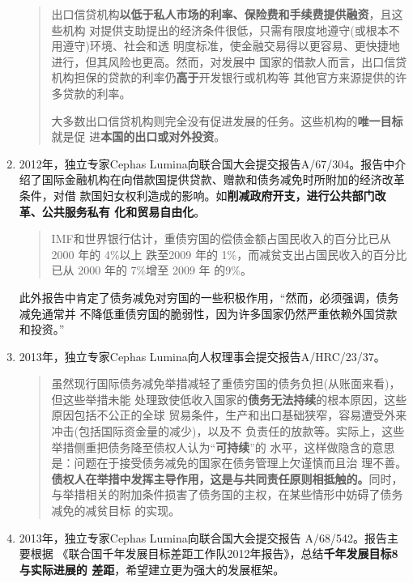 \begin{enumerate}
\begin{quotation}
    出口信贷机构\textbf{以低于私人市场的利率、保险费和手续费提供融资}，且这些机构
    对提供支助提出的经济条件很低，只需有限度地遵守(或根本不用遵守)环境、社会和透
    明度标准，使金融交易得以更容易、更快捷地进行，但其风险也更高。然而，对发展中
    国家的借款人而言，出口信贷机构担保的贷款的利率仍\textbf{高于}开发银行或机构等
    其他官方来源提供的许多贷款的利率。

    大多数出口信贷机构则完全没有促进发展的任务。这些机构的\textbf{唯一目标}就是促
    进\textbf{本国的出口或对外投资}。
  \end{quotation}

\item 2012年，独立专家Cephas Lumina向联合国大会提交报告A/67/304。报告中介
  绍了国际金融机构在向借款国提供贷款、赠款和债务减免时所附加的经济改革条件，对借
  款国妇女权利造成的影响。如\textbf{削减政府开支，进行公共部门改革、公共服务私有
    化和贸易自由化}。
  \begin{quotation}
    IMF和世界银行估计，重债穷国的偿债金额占国民收入的百分比已从 2000 年的 4\%以上
    跌至2009 年的 1\%，而减贫支出占国民收入的百分比已从 2000 年的 7\%增至 2009 年
    的9\%。
  \end{quotation}

  此外报告中肯定了债务减免对穷国的一些积极作用，“然而，必须强调，债务减免通常并
  不降低重债穷国的脆弱性，因为许多国家仍然严重依赖外国贷款和投资。”

\item 2013年，独立专家Cephas Lumina向人权理事会提交报告A/HRC/23/37。

  \begin{quotation}
    虽然现行国际债务减免举措减轻了重债穷国的债务负担(从账面来看)，但这些举措未能
    处理致使低收入国家的\textbf{债务无法持续}的根本原因，这些原因包括不公正的全球
    贸易条件，生产和出口基础狭窄，容易遭受外来冲击(包括国际资金量的减少)，以及不
    负责任的放款等。实际上，这些举措侧重把债务降至债权人认为“\textbf{可持续}”的
    水平，这样做隐含的意思是：问题在于接受债务减免的国家在债务管理上欠谨慎而且治
    理不善。\textbf{债权人在举措中发挥主导作用，这是与共同责任原则相抵触的。}同时，
    与举措相关的附加条件损害了债务国的主权，在某些情形中妨碍了债务减免的减贫目标
    的实现。
  \end{quotation}

\item 2013年，独立专家Cephas Lumina向联合国大会提交报告 A/68/542。报告主要根据
  《联合国千年发展目标差距工作队2012年报告》，总结\textbf{千年发展目标8与实际进展的
    差距}，希望建立更为强大的发展框架。


\end{enumerate}
